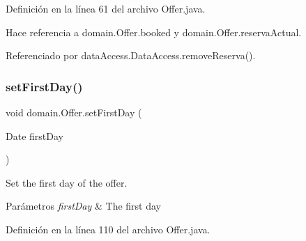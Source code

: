 Definición en la línea 61 del archivo Offer.\+java.


\begin{DoxyCode}{0}

\end{DoxyCode}


Hace referencia a domain.\+Offer.\+booked y domain.\+Offer.\+reserva\+Actual.



Referenciado por data\+Access.\+Data\+Access.\+remove\+Reserva().

\mbox{\label{classdomain_1_1_offer_aca5c8e3d34e700c8e51d1c9a0685e68f}} 
\subsubsection{\texorpdfstring{setFirstDay()}{setFirstDay()}}
{\footnotesize\ttfamily void domain.\+Offer.\+set\+First\+Day (\begin{DoxyParamCaption}\item[{Date}]{first\+Day }\end{DoxyParamCaption})}



Set the first day of the offer. 


\begin{DoxyParams}{Parámetros}
{\em first\+Day} & The first day \\
\hline
\end{DoxyParams}


Definición en la línea 110 del archivo Offer.\+java.


\begin{DoxyCode}{0}

\end{DoxyCode}


